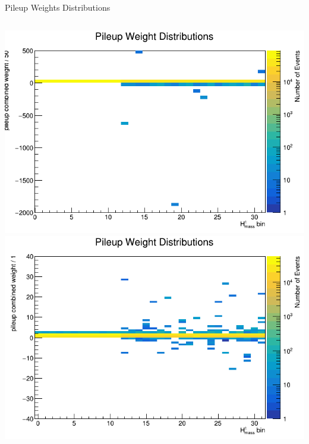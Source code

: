 \documentclass[aspectratio=169,xcolor=table]{beamer}
\begin{document}
   \begin{frame}[c]{Pileup Weights Distributions}
      \begin{columns}
        \centering
        \includegraphics[width=.95\textwidth,keepaspectratio=true]{pileup_histo.png}
        \centering
        \includegraphics[width=.95\textwidth,keepaspectratio=true]{pileup_histo_zoomed.png}
      \end{columns}
    \end{frame}
\end{document}
